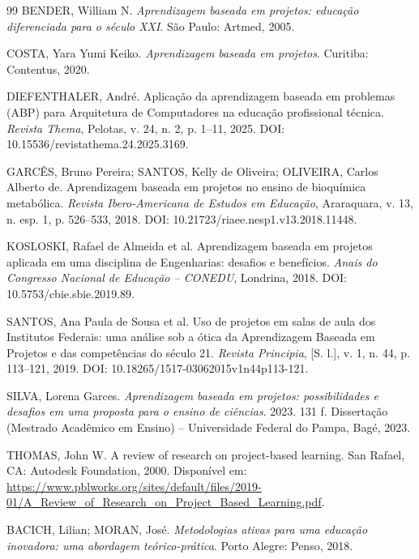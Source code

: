 \begin{thebibliography}{99}
BENDER, William N. \textit{Aprendizagem baseada em projetos: educação diferenciada para o século XXI}. São Paulo: Artmed, 2005.

COSTA, Yara Yumi Keiko. \textit{Aprendizagem baseada em projetos}. Curitiba: Contentus, 2020.

DIEFENTHALER, André. Aplicação da aprendizagem baseada em problemas (ABP) para Arquitetura de Computadores na educação profissional técnica. \textit{Revista Thema}, Pelotas, v. 24, n. 2, p. 1--11, 2025. DOI: 10.15536/revistathema.24.2025.3169.

GARCÊS, Bruno Pereira; SANTOS, Kelly de Oliveira; OLIVEIRA, Carlos Alberto de. Aprendizagem baseada em projetos no ensino de bioquímica metabólica. \textit{Revista Ibero-Americana de Estudos em Educação}, Araraquara, v. 13, n. esp. 1, p. 526--533, 2018. DOI: 10.21723/riaee.nesp1.v13.2018.11448.

KOSLOSKI, Rafael de Almeida et al. Aprendizagem baseada em projetos aplicada em uma disciplina de Engenharias: desafios e benefícios. \textit{Anais do Congresso Nacional de Educação -- CONEDU}, Londrina, 2018. DOI: 10.5753/cbie.sbie.2019.89.

SANTOS, Ana Paula de Sousa et al. Uso de projetos em salas de aula dos Institutos Federais: uma análise sob a ótica da Aprendizagem Baseada em Projetos e das competências do século 21. \textit{Revista Principia}, [S. l.], v. 1, n. 44, p. 113--121, 2019. DOI: 10.18265/1517-03062015v1n44p113-121.

SILVA, Lorena Garces. \textit{Aprendizagem baseada em projetos: possibilidades e desafios em uma proposta para o ensino de ciências}. 2023. 131 f. Dissertação (Mestrado Acadêmico em Ensino) -- Universidade Federal do Pampa, Bagé, 2023.

THOMAS, John W. A review of research on project-based learning. San Rafael, CA: Autodesk Foundation, 2000. Disponível em: \url{https://www.pblworks.org/sites/default/files/2019-01/A_Review_of_Research_on_Project_Based_Learning.pdf}.


BACICH, Lilian; MORAN, José. \textit{Metodologias ativas para uma educação inovadora: uma abordagem teórico-prática}. Porto Alegre: Penso, 2018.


\end{thebibliography}
